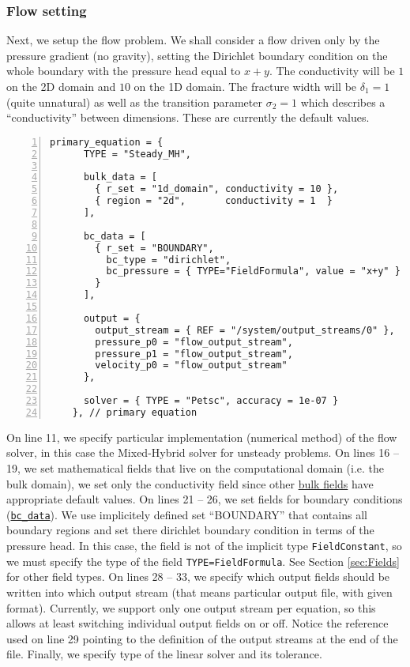 \documentclass[12pt,a4paper]{report}
\begin{document}
\subsubsection{Flow setting}
Next, we setup the flow problem. We shall consider a flow driven only by the pressure gradient (no gravity),
setting the Dirichlet boundary condition on the whole boundary with the pressure head equal to $x+y$. 
The conductivity will be $1$ on the 2D domain and $10$ on the 1D domain.
The fracture width will be $\delta_1=1$ (quite unnatural) as well as the transition parameter 
$\sigma_2 = 1$ which describes a ``conductivity'' between dimensions. 
These are currently the default values.

\begin{Verbatim}[numbers=left, firstnumber=last]
    primary_equation = {
      TYPE = "Steady_MH", 

      bulk_data = [
        { r_set = "1d_domain", conductivity = 10 },
        { region = "2d",       conductivity = 1  }
      ],
      
      bc_data = [
        { r_set = "BOUNDARY",
          bc_type = "dirichlet",
          bc_pressure = { TYPE="FieldFormula", value = "x+y" }
        }
      ],

      output = {
        output_stream = { REF = "/system/output_streams/0" }, 
        pressure_p0 = "flow_output_stream", 
        pressure_p1 = "flow_output_stream", 
        velocity_p0 = "flow_output_stream"
      }, 
      
      solver = { TYPE = "Petsc", accuracy = 1e-07 }
    }, // primary equation
\end{Verbatim}
On line 11, we specify particular implementation (numerical method) of the flow solver, in this case the Mixed-Hybrid
solver for unsteady problems. On lines 16 -- 19, we set mathematical fields that live on the computational domain 
(i.e. the bulk domain), we set only the conductivity field since other \hyperlink{IT::DarcyFlowMH-Steady-BulkData}{bulk fields} have appropriate default values.
On lines 21 -- 26, we set fields for boundary conditions (\hyperlink{IT::DarcyFlowMH-Steady-BulkData}{{\tt bc\_data}}). 
We use implicitely defined set ``BOUNDARY'' that contains all boundary regions and set there dirichlet boundary condition in terms of the 
pressure head. In this case, the field is not of the implicit type {\tt FieldConstant}, so we must specify the type of the field {\tt TYPE=FieldFormula}.
See Section \ref{sec:Fields} for other field types. 
On lines 28 -- 33, we specify which output fields should be written into which output stream (that means particular output file, with given format).
Currently, we support only one output stream per equation, so this allows at least switching individual output fields on or off. 
Notice the reference used on line 29 pointing to the definition of the output streams at the end of the file. Finally, we specify type of the linear solver and its tolerance.
\end{document}
